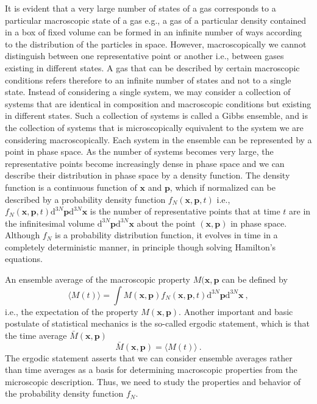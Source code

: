 \documentclass[12pt,a4paper]{article}
\renewcommand{\vec}[1]{\boldsymbol{#1}}
\newcommand{\dif}{\mathrm{d}}
\begin{document}
It is evident that a very large number of states of a gas corresponds to a particular macroscopic state of a gas e.g., a gas of a particular density contained in a box of fixed volume can be formed in an infinite number of ways according to the distribution of the particles in space. However, macroscopically we cannot distinguish between one representative point or another i.e., between gases existing in different states. A gas that can be described by certain macroscopic conditions refers therefore to an infinite number of states and not to a single state. Instead of considering a single system, we may consider a collection of systems that are identical in composition and macroscopic conditions but existing in different states. Such a collection of systems is called a Gibbs ensemble, and is the collection of systems that is microscopically equivalent to the system we are considering macroscopically. Each system in the ensemble can be represented by a point in phase space. As the number of systems becomes very large, the representative points become increasingly dense in phase space and we can describe their distribution in phase space by a density function. The density function is a continuous function of $\vec{x}$ and $\vec{p}$, which if normalized can be described by a probability density function $f_N(\vec{x}, \vec{p}, t)$ i.e., $f_N(\vec{x}, \vec{p}, t) \dif^{3N} \vec{p} \dif^{3N} \vec{x}$ is the number of representative points that at time $t$ are in the infinitesimal volume $\dif^{3N} \vec{p} \dif^{3N} \vec{x}$ about the point $(\vec{x}, \vec{p})$ in phase space. Although $f_N$ is a probability distribution function, it evolves in time in a completely deterministic manner, in principle though solving Hamilton's equations.

An ensemble average of the macroscopic property $M(\vec{x}, \vec{p}$ can be defined by
\begin{equation}
\langle M(t) \rangle = \int M(\vec{x}, \vec{p}) f_N(\vec{x}, \vec{p}, t) \dif^{3N} \vec{p} \dif^{3N} \vec{x} ~,
\end{equation}
i.e., the expectation of the property $M(\vec{x}, \vec{p})$. Another important and basic postulate of statistical mechanics is the so-called ergodic statement, which is that the time average $\bar{M}(\vec{x}, \vec{p})$
\begin{equation}
\bar{M}(\vec{x}, \vec{p}) = \langle M(t) \rangle ~.
\end{equation}
The ergodic statement asserts that we can consider ensemble averages rather than time averages as a basis for determining macroscopic properties from the microscopic description. Thus, we need to study the properties and behavior of the probability density function $f_N$.
\end{document}
